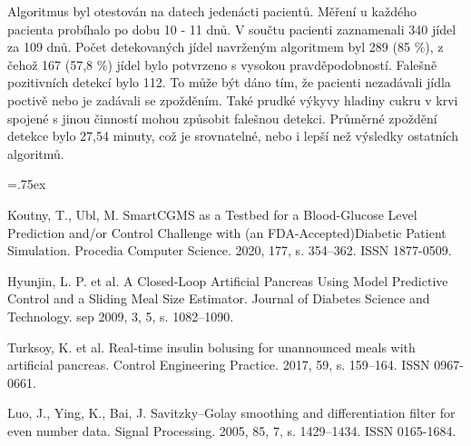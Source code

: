 \documentclass{template_svk}
\begin{document}
Algoritmus byl otestován na datech jedenácti pacientů. Měření u každého pacienta probíhalo po dobu 10 - 11 dnů. V součtu pacienti zaznamenali 340 jídel za 109 dnů. Počet detekovaných jídel navrženým algoritmem byl 289 (85 \%), z čehož 167 (57,8 \%) jídel bylo potvrzeno s vysokou pravděpodobností. Falešně pozitivních detekcí bylo 112. To může být dáno tím, že pacienti nezadávali jídla poctivě nebo je zadávali se zpožděním. Také prudké výkyvy hladiny cukru v krvi spojené s jinou činností mohou způsobit falešnou detekci. Průměrné zpoždění detekce bylo 27,54 minuty, což je srovnatelné, nebo i lepší než výsledky ostatních algoritmů. 


\begin{thebibliography}{99}\itemsep=.75ex%

Koutny, T., Ubl, M. SmartCGMS as a Testbed for a Blood-Glucose Level Prediction and/or Control Challenge with (an FDA-Accepted)Diabetic Patient Simulation. Procedia Computer Science. 2020, 177, s. 354–362. ISSN 1877-0509.

Hyunjin, L. P. et al. A Closed-Loop Artificial Pancreas Using Model Predictive Control and a Sliding Meal Size Estimator. Journal of Diabetes Science and Technology. sep 2009, 3, 5, s. 1082–1090. 

Turksoy, K. et al. Real-time insulin bolusing for unannounced meals with artificial pancreas. Control Engineering Practice. 2017, 59, s. 159–164. ISSN 0967-0661.

 Luo, J., Ying, K., Bai, J. Savitzky–Golay smoothing and differentiation filter for even number data. Signal Processing. 2005, 85, 7, s. 1429–1434. ISSN 0165-1684. 

\end{thebibliography}
\end{document}
